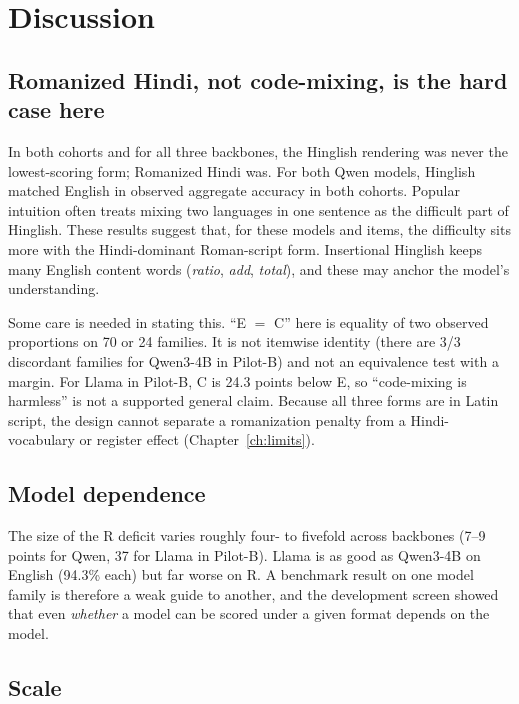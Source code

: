 \documentclass[12pt,a4paper,oneside]{report}
\renewcommand{\_}{\oldunderscore\allowbreak}
\begin{document}
\chapter{Discussion}
\label{ch:discussion}

\section{Romanized Hindi, not code-mixing, is the hard case here}

In both cohorts and for all three backbones, the Hinglish rendering was never the lowest-scoring form; Romanized Hindi was. For both Qwen models, Hinglish matched English in observed aggregate accuracy in both cohorts. Popular intuition often treats mixing two languages in one sentence as the difficult part of Hinglish. These results suggest that, for these models and items, the difficulty sits more with the Hindi-dominant Roman-script form. Insertional Hinglish keeps many English content words (\emph{ratio}, \emph{add}, \emph{total}), and these may anchor the model's understanding.

Some care is needed in stating this. ``E $=$ C'' here is equality of two observed proportions on 70 or 24 families. It is not itemwise identity (there are 3/3 discordant families for Qwen3-4B in Pilot-B) and not an equivalence test with a margin. For Llama in Pilot-B, C is 24.3 points below E, so ``code-mixing is harmless'' is not a supported general claim. Because all three forms are in Latin script, the design cannot separate a romanization penalty from a Hindi-vocabulary or register effect (Chapter~\ref{ch:limits}).

\section{Model dependence}

The size of the R deficit varies roughly four- to fivefold across backbones (7--9 points for Qwen, 37 for Llama in Pilot-B). Llama is as good as Qwen3-4B on English (94.3\% each) but far worse on R. A benchmark result on one model family is therefore a weak guide to another, and the development screen showed that even \emph{whether} a model can be scored under a given format depends on the model.

\section{Scale}
\end{document}

